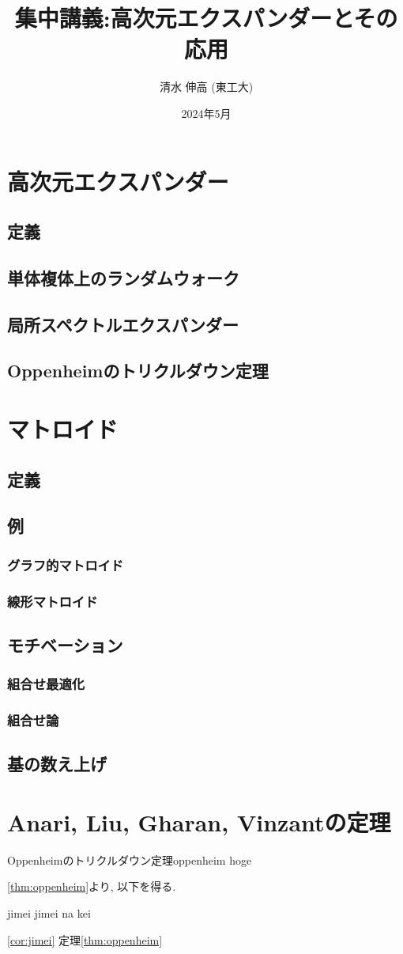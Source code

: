\documentclass[11pt]{article}
\title{集中講義:高次元エクスパンダーとその応用}
\author{清水 伸高 (東工大)}
\date{2024年5月}
\begin{document}
\maketitle
\tableofcontents



\section{高次元エクスパンダー}
\subsection{定義}
\subsection{単体複体上のランダムウォーク}
\subsection{局所スペクトルエクスパンダー}
\subsection{Oppenheimのトリクルダウン定理}

\section{マトロイド}
\subsection{定義}
\subsection{例}
\subsubsection{グラフ的マトロイド}
\subsubsection{線形マトロイド}
\subsection{モチベーション}
\subsubsection{組合せ最適化}
\subsubsection{組合せ論}
\subsection{基の数え上げ}

\section{Anari, Liu, Gharan, Vinzantの定理}


\begin{theorem}{Oppenheimのトリクルダウン定理}{oppenheim}
    hoge
\end{theorem}
\newpage
\cref{thm:oppenheim}より, 以下を得る.
\begin{corollary}{}{jimei}
    jimei na kei
\end{corollary}
\cref{cor:jimei}
定理\ref{thm:oppenheim}
\end{document}
